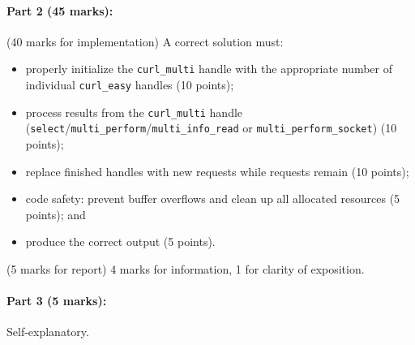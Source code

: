 \documentclass[letterpaper,10pt]{article}
\begin{document}
\paragraph{Part 2 (45 marks):} (40 marks for implementation) A correct solution must:
\begin{itemize}
\item properly initialize the {\tt curl\_multi} handle with the appropriate number of individual {\tt curl\_easy} handles (10 points);
\item process results from the {\tt curl\_multi} handle ({\tt select}/{\tt multi\_perform}/{\tt multi\_info\_read} or {\tt multi\_perform\_socket}) (10 points); 
\item replace finished handles with new requests while requests remain (10 points);
\item code safety: prevent buffer overflows and clean up all allocated resources (5 points); and
\item produce the correct output (5 points).
\end{itemize}

\noindent (5 marks for report) 4 marks for information, 1 for clarity of exposition.

\paragraph{Part 3 (5 marks):} Self-explanatory.
\end{document}
